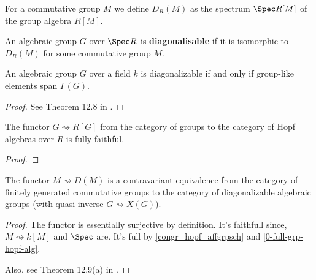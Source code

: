 \begin{definition}
  \label{0-spec-grp-alg}
  \leanok

  For a commutative group $M$ we define $D_R(M)$ as the spectrum $\Spec R[M]$ of the group algebra $R[M]$.
\end{definition}


\begin{definition}
  \label{0-diag}

  An algebraic group $G$ over $\Spec R$ is {\bf diagonalisable}
  if it is isomorphic to $D_R(M)$ for some commutative group $M$.
\end{definition}


\begin{theorem}
  \label{0-diag-iff-grp-like-span}
  \leanok

  An algebraic group $G$ over a field $k$ is diagonalizable if and only if group-like elements span $\Gamma(G)$.
\end{theorem}
\begin{proof}

  See Theorem 12.8 in \cite{Milne_2017}.
\end{proof}


\begin{proposition}
  \label{0-full-grp-hopf-alg}
  \uses{}

  The functor $G \rightsquigarrow R[G]$ from the category of groups to the category of Hopf algebras over $R$ is fully faithful.
\end{proposition}
\begin{proof}

\end{proof}


\begin{theorem}
  \label{0-fg-comm-grp-equiv-diag-grp-sch}
  The functor $M\rightsquigarrow D(M)$ is a contravariant equivalence
  from the category of finitely generated commutative groups to the category of
  diagonalizable algebraic groups (with quasi-inverse $G \rightsquigarrow X(G)$).
\end{theorem}
\begin{proof}

  The functor is essentially surjective by definition.
  It's faithfull since, $M\rightsquigarrow k[M]$ and $\Spec$ are.
  It's full by \ref{congr_hopf_affgrpsch} and \ref{0-full-grp-hopf-alg}.

  Also, see Theorem 12.9(a) in \cite{Milne_2017}.
\end{proof}
